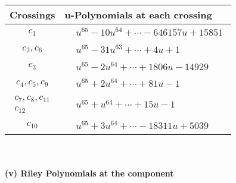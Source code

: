 \documentclass[1p]{elsarticle_modified}
\theoremstyle{definition}
\begin{document}
\begin{tabular}{m{50pt}|m{274pt}}
Crossings & \hspace{64pt}u-Polynomials at each crossing \\
\hline $$\begin{aligned}c_{1}\end{aligned}$$&$\begin{aligned}
&u^{65}-10 u^{64}+\cdots-646157 u+15851
\end{aligned}$\\
\hline $$\begin{aligned}c_{2},c_{6}\end{aligned}$$&$\begin{aligned}
&u^{65}-31 u^{63}+\cdots+4 u+1
\end{aligned}$\\
\hline $$\begin{aligned}c_{3}\end{aligned}$$&$\begin{aligned}
&u^{65}-2 u^{64}+\cdots+1806 u-14929
\end{aligned}$\\
\hline $$\begin{aligned}c_{4},c_{5},c_{9}\end{aligned}$$&$\begin{aligned}
&u^{65}+2 u^{64}+\cdots+81 u-1
\end{aligned}$\\
\hline $$\begin{aligned}c_{7},c_{8},c_{11}\\c_{12}\end{aligned}$$&$\begin{aligned}
&u^{65}+u^{64}+\cdots+15 u-1
\end{aligned}$\\
\hline $$\begin{aligned}c_{10}\end{aligned}$$&$\begin{aligned}
&u^{65}+3 u^{64}+\cdots-18311 u+5039
\end{aligned}$\\
\hline
\end{tabular}\\~\\
\newpage\renewcommand{\arraystretch}{1}
\flushleft \textbf{(v) Riley Polynomials at the component}\newline \\
\end{document}
